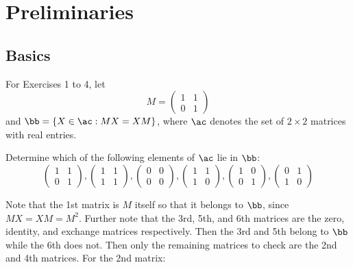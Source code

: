 \setcounter{section}{-1}

\section{Preliminaries}

\subsection{Basics}

For Exercises 1 to 4, let
$$M = 
\begin{pmatrix}
    1 & 1 \\
    0 & 1
\end{pmatrix}$$
and $\bb = \{X \in \ac : MX = XM\}$, where $\ac$ denotes the set of $2 \times 2$ matrices with real entries.
\begin{problems}
    \item Determine which of the following elements of $\ac$ lie in $\bb$:
    $$
    \begin{pmatrix}
        1 & 1 \\
        0 & 1
    \end{pmatrix},
    \begin{pmatrix}
        1 & 1 \\
        1 & 1
    \end{pmatrix},
    \begin{pmatrix}
        0 & 0 \\
        0 & 0
    \end{pmatrix},
    \begin{pmatrix}
        1 & 1 \\
        1 & 0
    \end{pmatrix},
    \begin{pmatrix}
        1 & 0 \\
        0 & 1
    \end{pmatrix},
    \begin{pmatrix}
        0 & 1 \\
        1 & 0 
    \end{pmatrix}$$
    \begin{sol}
        Note that the 1st matrix is $M$ itself so that it belongs to $\bb$, since $MX = XM = M^2$. Further note that the 3rd, 5th, and 6th matrices are the zero, identity, and exchange matrices respectively. Then the 3rd and 5th belong to $\bb$ while the 6th does not. Then only the remaining matrices to check are the 2nd and 4th matrices. For the 2nd matrix:
        \begin{align*}

\end{align*}
\end{sol}
\end{problems}
